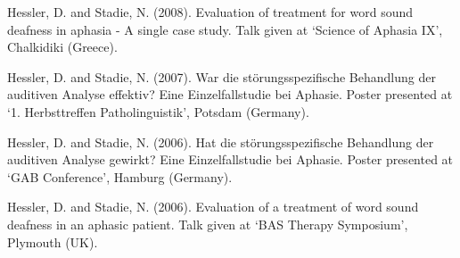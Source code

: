 \documentclass[11pt]{article}
\makeatletter
\newlength{\bibhang}
\newlength{\bibsep}
 {\@listi \global\bibsep\itemsep \global\advance\bibsep by\parsep}
\newenvironment{bibsection}%
        {\vspace{-\baselineskip}\begin{list}{}{%
       \setlength{\leftmargin}{\bibhang}%
       \setlength{\itemindent}{-\leftmargin}%
       \setlength{\itemsep}{\bibsep}%
       \setlength{\parsep}{\z@}%
        \setlength{\partopsep}{0pt}%
        \setlength{\topsep}{0pt}}}
        {\end{list}\vspace{-.6\baselineskip}}
\makeatother
\begin{document}
\begin{bibsection}
\item Hessler, D. and Stadie, N. (2008). Evaluation of treatment for word sound deafness in aphasia - A single case study. Talk given at `Science of Aphasia IX', Chalkidiki (Greece). 

\item Hessler, D. and Stadie, N. (2007). War die st\"{o}rungsspezifische Behandlung der auditiven Analyse effektiv? Eine Einzelfallstudie bei Aphasie. Poster presented at `1. Herbsttreffen Patholinguistik', Potsdam (Germany).

\item Hessler, D. and Stadie, N. (2006). Hat die st\"{o}rungsspezifische Behandlung der auditiven Analyse gewirkt? Eine Einzelfallstudie bei Aphasie. Poster presented at `GAB Conference', Hamburg (Germany).

\item Hessler, D. and Stadie, N. (2006). Evaluation of a treatment of word sound deafness in an aphasic patient. Talk given at `BAS Therapy Symposium', Plymouth (UK).

\end{bibsection}
\end{document}
